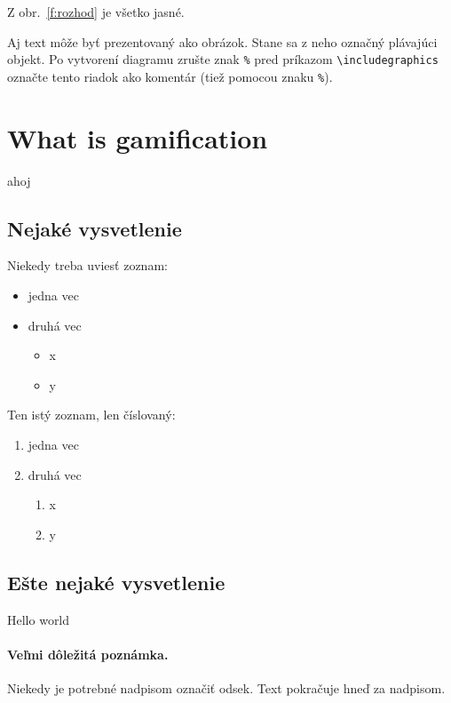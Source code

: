 \documentclass[10pt,twoside,english,a4paper]{article}
\begin{document}
Z obr.~\ref{f:rozhod} je všetko jasné. 

\begin{figure*}[tbh]
\centering
Aj text môže byť prezentovaný ako obrázok. Stane sa z neho označný plávajúci objekt. Po vytvorení diagramu zrušte znak \texttt{\%} pred príkazom \verb|\includegraphics| označte tento riadok ako komentár (tiež pomocou znaku \texttt{\%}).
\caption{Rozhodujúci argument.}
\label{f:rozhod}
\end{figure*}



\section{What is gamification} \label{section3}
ahoj\cite{Raymer}
\subsection{Nejaké vysvetlenie} \label{section3:1}

Niekedy treba uviesť zoznam:

\begin{itemize}
\item jedna vec\cite{Abu-Dawood}
\item druhá vec\cite{AL-Smadi}
	\begin{itemize}
	\item x\cite{LiDongUntchChasteen}
	\item y
	\end{itemize}
\end{itemize}

Ten istý zoznam, len číslovaný:

\begin{enumerate}
\item jedna vec
\item druhá vec
	\begin{enumerate}
	\item x
	\item y
	\end{enumerate}
\end{enumerate}


\subsection{Ešte nejaké vysvetlenie} \label{section3:2}
Hello world

\paragraph{Veľmi dôležitá poznámka.}
Niekedy je potrebné nadpisom označiť odsek. Text pokračuje hneď za nadpisom.
\end{document}
